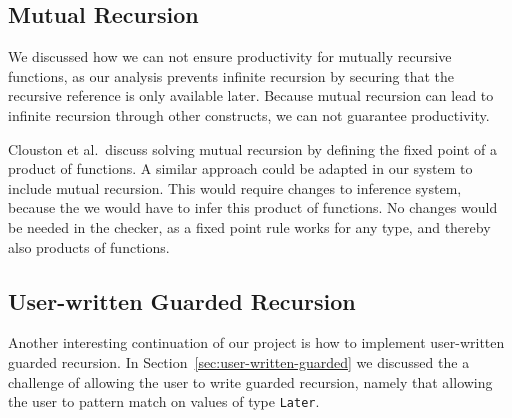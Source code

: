 \subsection{Mutual Recursion}
We discussed how we can not ensure productivity for mutually recursive
functions, as our analysis prevents infinite recursion by securing that the
recursive reference is only available later. Because mutual recursion can lead
to infinite recursion through other constructs, we can not guarantee productivity.

Clouston et al.\,\citep{BirkedalL:guarded-lambda-conf} discuss solving mutual
recursion by defining the fixed point of a product of functions. A similar
approach could be adapted in our system to include mutual recursion. This would
require changes to inference system, because the we would have to infer this
product of functions. No changes would be needed in the checker, as a fixed
point rule works for any type, and thereby also products of functions. 

\subsection{User-written Guarded Recursion}
Another interesting continuation of our project is how to implement user-written
guarded recursion. In Section~\ref{sec:user-written-guarded} we discussed the
a challenge of allowing the user to write guarded recursion, namely that
allowing the user to pattern match on values of type \texttt{Later}.


